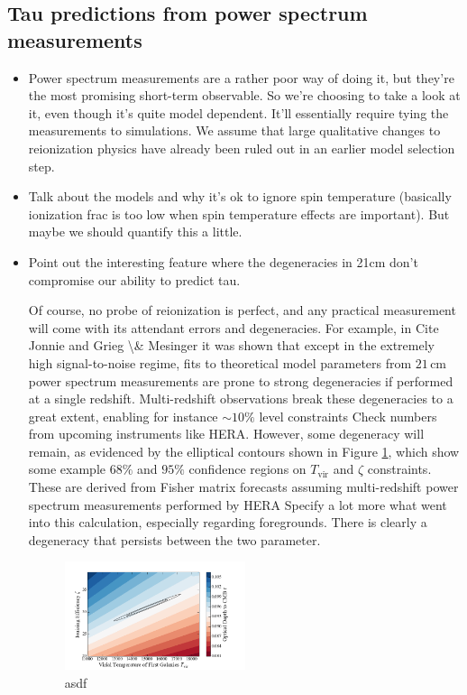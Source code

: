 \documentclass[twocolumn,aps,prd,nofootinbib,showpacs]{revtex4-1}
\begin{document}
\subsection{Tau predictions from power spectrum measurements}
\begin{itemize}
\item Power spectrum measurements are a rather poor way of doing it, but they're the most promising short-term observable. So we're choosing to take a look at it, even though it's quite model dependent. It'll essentially require tying the measurements to simulations. We assume that large qualitative changes to reionization physics have already been ruled out in an earlier model selection step.
\item Talk about the models and why it's ok to ignore spin temperature (basically ionization frac is too low when spin temperature effects are important). But maybe we should quantify this a little.
\item Point out the interesting feature where the degeneracies in 21cm don't compromise our ability to predict tau.

Of course, no probe of reionization is perfect, and any practical measurement will come with its attendant errors and degeneracies. For example, in \acl{Cite Jonnie and Grieg \& Mesinger} it was shown that except in the extremely high signal-to-noise regime, fits to theoretical model parameters from $21\,\textrm{cm}$ power spectrum measurements are prone to strong degeneracies if performed at a single redshift. Multi-redshift observations break these degeneracies to a great extent, enabling for instance $\sim 10\%$ level constraints \acl{Check numbers} from upcoming instruments like HERA. However, some degeneracy will remain, as evidenced by the elliptical contours shown in Figure \ref{fig:21cmDegen_wTau}, which show some example $68\%$ and $95\%$ confidence regions on $T_\textrm{vir}$ and $\zeta$ constraints. These are derived from Fisher matrix forecasts assuming multi-redshift power spectrum measurements performed by HERA \acl{Specify a lot more what went into this calculation, especially regarding foregrounds}. There is clearly a degeneracy that persists between the two parameter.

\begin{figure}[!]
	\centering
	\includegraphics[width=0.5\textwidth]{figures/21cmDegen_wTau.png}
	\caption{asdf}
	\label{fig:21cmDegen_wTau}
\end{figure}


\end{itemize}
\end{document}
